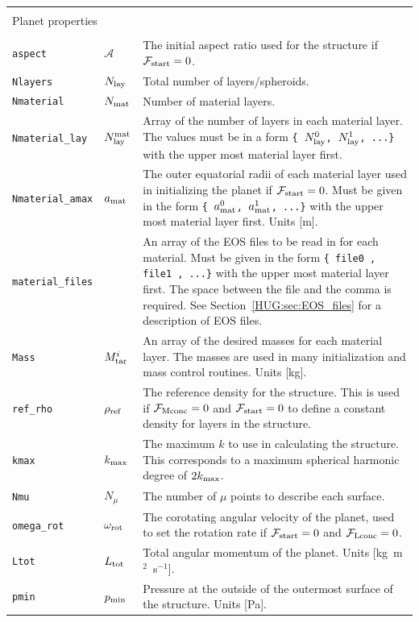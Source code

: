 \documentclass[11pt, oneside]{article}   	%
\begin{document}
\begin{longtable}{l l p{10cm}}
\multicolumn{3}{l}{} \\
\multicolumn{3}{l}{{Planet properties}} \\
\hline
\multicolumn{3}{l}{} \\

\texttt{aspect} & $\mathcal{A}$ & The initial aspect ratio used for the structure if $\mathcal{F}_{\rm start}=0$. \\
\texttt{Nlayers} & $N_{\rm lay}$ & Total number of layers/spheroids. \\
\texttt{Nmaterial} & $N_{\rm mat}$ & Number of material layers. \\
\texttt{Nmaterial\_lay} & $N_{\rm lay}^{\rm mat}$ & Array of the number of layers in each material layer. The values must be in a form \texttt{\{ $N_{\rm lay}^0$,  $N_{\rm lay}^1$, ...\}} with the upper most material layer first. \\
\texttt{Nmaterial\_amax} & $a_{\rm mat}$ & The outer equatorial radii of each material layer used in initializing the planet if $\mathcal{F}_{\rm start}=0$. Must be given in the form \texttt{\{ $a_{\rm mat}^0$,  $a_{\rm mat}^1$, ...\}} with the upper most material layer first. Units [m]. \\
\texttt{material\_files} & & An array of the EOS files to be read in for each material. Must be given in the form \texttt{\{ file0 ,  file1 , ...\}} with the upper most material layer first. The space between the file and the comma is required. See Section~\ref{HUG:sec:EOS_files} for a description of EOS files. \\
\texttt{Mass} & $M_{\rm tar}^i$ & An array of the desired masses for each material layer. The masses are used in many initialization and mass control routines. Units [kg]. \\
\texttt{ref\_rho} & $\rho_{\rm ref}$ & The reference density for the structure. This is used if $\mathcal{F}_{\rm Mconc}=0$ and $\mathcal{F}_{\rm start}=0$ to define a constant density for layers in the structure. \\
\texttt{kmax} & $k_{\rm max}$ & The maximum $k$ to use in calculating the structure. This corresponds to a maximum spherical harmonic degree of $2k_{\rm max}$. \\
\texttt{Nmu} & $N_{\mu}$ & The number of $\mu$ points to describe each surface. \\
\texttt{omega\_rot} & $\omega_{\rm rot}$ & The corotating angular velocity of the planet, used to set the rotation rate if $\mathcal{F}_{\rm start}=0$ and $\mathcal{F}_{\rm Lconc}=0$. \\
\texttt{Ltot} & $L_{\rm tot}$ & Total angular momentum of the planet. Units [kg~m$^2$~s$^{-1}$]. \\
\texttt{pmin} & $p_{\rm min}$ & Pressure at the outside of the outermost surface of the structure. Units [Pa]. \\

\end{longtable}
\end{document}

